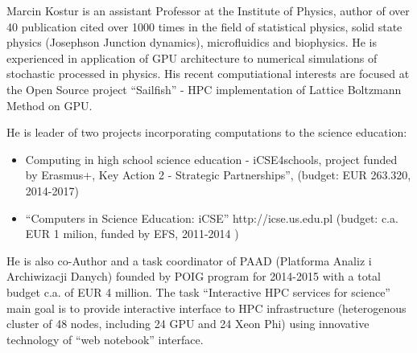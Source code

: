 \begin{participant}[type=leadPI,PM=12,salary=1500,gender=male]{Marcin Kostur}
is an assistant Professor at the Institute of Physics, author of  over 40
publication cited over 1000 times in the field of statistical physics,
solid state physics (Josephson Junction dynamics), microfluidics and
biophysics. He is experienced in application of GPU architecture to
numerical simulations of stochastic processed in physics. His recent
computiational interests are focused at the Open Source project
``Sailfish'' - HPC implementation of Lattice Boltzmann Method on GPU.

He is leader of two projects incorporating computations to the science education:

\begin{itemize}
\item Computing in high school science education - iCSE4schools,
  project funded by Erasmus+, Key Action 2 - Strategic Partnerships'',
  (budget: EUR 263.320, 2014-2017)
\item ``Computers in Science Education: iCSE'' http://icse.us.edu.pl
  (budget: c.a. EUR 1 milion, funded by EFS, 2011-2014 )
\end{itemize}

He is also co-Author and a task coordinator of PAAD (Platforma Analiz i
Archiwizacji Danych) founded by POIG program for 2014-2015 with a total budget
c.a. of EUR 4 million. The task ``Interactive HPC services for science''
main goal is to provide interactive interface to HPC infrastructure
(heterogenous cluster of 48 nodes, including 24 GPU and 24 Xeon Phi)
using innovative technology of ``web notebook'' interface.  




\end{participant}
